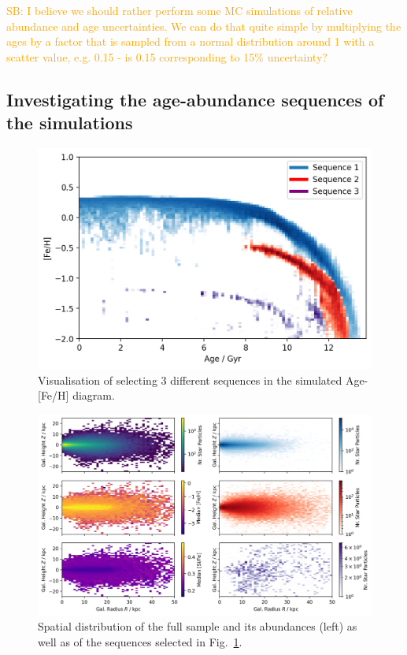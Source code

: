 \documentclass[fleqn,usenatbib]{mnras}
\newcommand{\SB}[1]{{\textcolor{orange}{SB: #1}}}
\begin{document}
\SB{I believe we should rather perform some MC simulations of relative abundance and age uncertainties. We can do that quite simple by multiplying the ages by a factor that is sampled from a normal distribution around 1 with a scatter value, e.g. 0.15 - is 0.15 corresponding to 15\% uncertainty?}

\subsection{Investigating the age-abundance sequences of the simulations}

\begin{figure}
	\includegraphics[width=\columnwidth]{figures/sequences_in_age_feh.png}
    \caption{Visualisation of selecting 3 different sequences in the simulated Age-[Fe/H] diagram.}
    \label{fig:sequences_in_age_feh}
\end{figure}

\begin{figure}
	\includegraphics[width=\columnwidth]{figures/sequences_in_space.png}
    \caption{Spatial distribution of the full sample and its abundances (left) as well as of the sequences selected in Fig.~\ref{fig:sequences_in_age_feh}.}
    \label{fig:sequences_in_space}
\end{figure}
\end{document}
